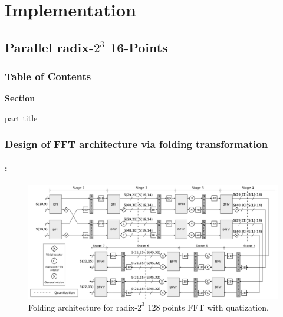 \section{Implementation}
\subsection{Parallel radix-$2^3$ 16-Points}
\begin{frame}
  \frametitle{\textbf{Table of Contents}}
  \begin{center}
    {\vspace{-1.5cm}\Large \textbf{Section \thesection}\vspace{0.5cm}}
    \begin{beamercolorbox}[
      sep=8pt,center]{part title}
      \textbf{\insertsection}
    \end{beamercolorbox}
  \end{center}
\end{frame}


\begin{frame}
	\frametitle{\textbf{Design of FFT architecture via folding transformation}}
	\framesubtitle{\secname : \subsecname}
		\begin{figure}[h!] \centering
		   	\includegraphics[width=0.90\paperwidth]{./image/folding-128-quant.png}
		   	\caption{ \tiny Folding architecture for radix-$2^3$  128 points FFT with quatization.}
		\end{figure}  	
\end{frame}


